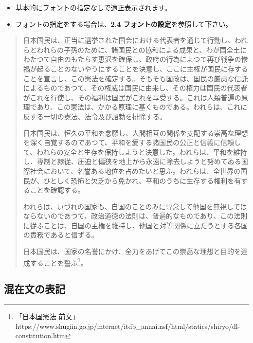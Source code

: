 \documentclass[a4paper,12pt]{ltjsarticle}
\def\fs#1{\fontsize{#1}{#1}\selectfont }
\begin{document}
\begin{itemize}
  \item 基本的にフォントの指定なしで適正表示されます。
  \item フォントの指定をする場合は、\textbf{2.4 フォントの設定}を参照して下さい。\end{itemize}
\vspace{-2mm}
\begin{quote}
\begin{spacing}{1.4}
{\fs{12pt}
\quad 日本国民は、正当に選挙された国会における代表者を通じて行動し、われらとわれらの子孫のために、諸国民との協和による成果と、わが国全土にわたつて自由のもたらす恵沢を確保し、政府の行為によつて再び戦争の惨禍が起ることのないやうにすることを決意し、ここに主権が国民に存することを宣言し、この憲法を確定する。そもそも国政は、国民の厳粛な信託によるものであつて、その権威は国民に由来し、その権力は国民の代表者がこれを行使し、その福利は国民がこれを享受する。これは人類普遍の原理であり、この憲法は、かかる原理に基くものである。われらは、これに反する一切の憲法、法令及び詔勅を排除する。\par
\quad 日本国民は、恒久の平和を念願し、人間相互の関係を支配する崇高な理想を深く自覚するのであつて、平和を愛する諸国民の公正と信義に信頼して、われらの安全と生存を保持しようと決意した。われらは、平和を維持し、専制と隷従、圧迫と偏狭を地上から永遠に除去しようと努めてゐる国際社会において、名誉ある地位を占めたいと思ふ。われらは、全世界の国民が、ひとしく恐怖と欠乏から免かれ、平和のうちに生存する権利を有することを確認する。\par
\quad われらは、いづれの国家も、自国のことのみに専念して他国を無視してはならないのであつて、政治道徳の法則は、普遍的なものであり、この法則に従ふことは、自国の主権を維持し、他国と対等関係に立たうとする各国の責務であると信ずる。\par
\quad 日本国民は、国家の名誉にかけ、全力をあげてこの崇高な理想と目的を達成することを誓ふ\footnote{「日本国憲法 前文」\\https://www.shugiin.go.jp/internet/itdb_annai.nsf/html/statics/shiryo/dl-constitution.htm}。\par}
\end{spacing}
\end{quote}

\newpage

\subsection{混在文の表記}
\vspace{-2mm}
\end{document}
